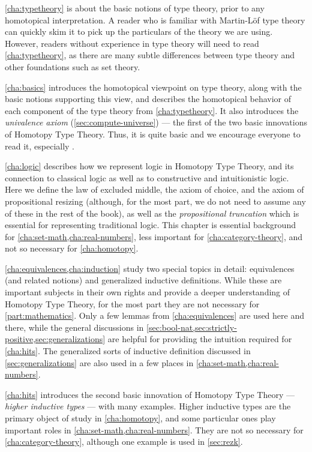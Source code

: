 \cref{cha:typetheory} is about the basic notions of type theory, prior to any homotopical interpretation.
A reader who is familiar with Martin-L\"of type theory can quickly skim it to pick up the particulars of the theory we are using.
However, readers without experience in type theory will need to read \cref{cha:typetheory}, as there are many subtle differences between type theory and other foundations such as set theory.

\cref{cha:basics} introduces the homotopical viewpoint on type theory, along with the basic notions supporting this view, and describes the homotopical behavior of each component of the type theory from \cref{cha:typetheory}.
It also introduces the \emph{univalence axiom} (\cref{sec:compute-universe}) --- the first of the two basic innovations of Homotopy Type Theory.
Thus, it is quite basic and we encourage everyone to read it, especially .

\cref{cha:logic} describes how we represent logic in Homotopy Type Theory, and its connection to classical logic as well as to constructive and intuitionistic logic.
Here we define the law of excluded middle, the axiom of choice, and the axiom of propositional resizing (although, for the most part, we do not need to assume any of these in the rest of the book), as well as the \emph{propositional truncation} which is essential for representing traditional logic.
This chapter is essential background for \cref{cha:set-math,cha:real-numbers}, less important for \cref{cha:category-theory}, and not so necessary for \cref{cha:homotopy}.

\cref{cha:equivalences,cha:induction} study two special topics in detail: equivalences (and related notions) and generalized inductive definitions.
While these are important subjects in their own rights and provide a deeper understanding of Homotopy Type Theory, for the most part they are not necessary for \cref{part:mathematics}.
Only a few lemmas from \cref{cha:equivalences} are used here and there, while the general discussions in \cref{sec:bool-nat,sec:strictly-positive,sec:generalizations} are helpful for providing the intuition required for \cref{cha:hits}.
The generalized sorts of inductive definition discussed in \cref{sec:generalizations} are also used in a few places in \cref{cha:set-math,cha:real-numbers}.

\cref{cha:hits} introduces the second basic innovation of Homotopy Type Theory --- \emph{higher inductive types} --- with many examples.
Higher inductive types are the primary object of study in \cref{cha:homotopy}, and some particular ones play important roles in \cref{cha:set-math,cha:real-numbers}.
They are not so necessary for \cref{cha:category-theory}, although one example is used in \cref{sec:rezk}.

